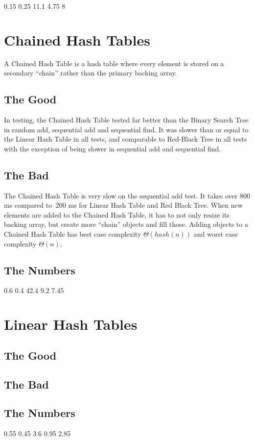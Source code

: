 \documentclass{muformallab}
\begin{document}
   {0.15} {0.25} {11.1} {4.75} {8}

  \section{Chained Hash Tables}

  A Chained Hash Table is a hash table where every element is stored on
  a secondary ``chain'' rather than the primary backing array.

  \subsection{The Good}

  In testing, the Chained Hash Table tested far better than the Binary
  Search Tree in random add, sequential add and sequential find. It was
  slower than or equal to the Linear Hash Table in all tests, and
  comparable to Red-Black Tree in all tests with the exception of being
  slower in sequential add and sequential find.

  \subsection{The Bad}

  The Chained Hash Table is very slow on the sequential add test. It takes
  over $800$ ms compared to $~200$ ms for Linear Hash Table and Red Black
  Tree. When new elements are added to the Chained Hash Table, it has to
  not only resize its backing array, but create more ``chain'' objects and
  fill those. Adding objects to a Chained Hash Table has best case
  complexity $\Theta \left( hash \left( n \right) \right)$ and worst case
  complexity $\Theta \left( n \right)$.

  \subsection{The Numbers}

   {0.6} {0.4} {42.4} {9.2} {7.45}

  \section{Linear Hash Tables}

  \subsection{The Good}

  \subsection{The Bad}

  \subsection{The Numbers}

   {0.55} {0.45} {3.6} {0.95} {2.85}
\end{document}
